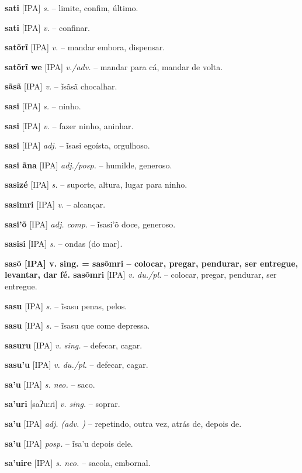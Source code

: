 {\textbf{sati} [IPA] \textit{s.} -- limite, confim, último.

\textbf{sati} [IPA] \textit{v.} -- confinar.

\textbf{satõrĩ} [IPA] \textit{v.} -- mandar embora, dispensar.

\textbf{satõrĩ we} [IPA] \textit{v./adv.} -- mandar para cá, mandar de volta.

\textbf{sãsã} [IPA] \textit{v.} -- ĩsãsã chocalhar.

\textbf{sasi} [IPA] \textit{s.} -- ninho.

\textbf{sasi} [IPA] \textit{v.} -- fazer ninho, aninhar.

\textbf{sasi} [IPA] \textit{adj.} -- ĩsasi egoísta, orgulhoso.

\textbf{sasi ãna} [IPA] \textit{adj./posp.} -- humilde, generoso.

\textbf{sasizé} [IPA] \textit{s.} -- suporte, altura, lugar para ninho.

\textbf{sasimri} [IPA] \textit{v.} -- alcançar.

\textbf{sasi'õ} [IPA] \textit{adj. comp.} -- ĩsasi'õ doce, generoso.

\textbf{sasisi} [IPA] \textit{s.} -- ondas (do mar).

\textbf{sasõ [IPA] v. sing. = sasõmri -- colocar, pregar, pendurar, ser entregue, levantar, dar fé. sasõmri} [IPA] \textit{v. du./pl.} -- colocar, pregar, pendurar, ser entregue.

\textbf{sasu} [IPA] \textit{s.} -- ĩsasu penas, pelos.

\textbf{sasu} [IPA] \textit{s.} -- ĩsasu que come depressa.

\textbf{sasuru} [IPA] \textit{v. sing.} -- defecar, cagar. \href{https://xavante.pythonanywhere.com/static/dicionario/play.html?file=defecate03.wav}{\faHeadphones}

\textbf{sasu'u} [IPA] \textit{v. du./pl.} -- defecar, cagar.

\textbf{sa'u} [IPA] \textit{s. neo.} -- saco.

\textbf{sa'uri} [saʔu:ɾi] \textit{v. sing.} -- soprar. \href{https://xavante.pythonanywhere.com/static/dicionario/play.html?file=blow.wav}{\faHeadphones}

\textbf{sa'u} [IPA] \textit{adj. (adv. )} -- repetindo, outra vez, atrás de, depois de.

\textbf{sa'u} [IPA] \textit{posp.} -- ĩsa'u depois dele.

\textbf{sa'uire} [IPA] \textit{s. neo.} -- sacola, embornal.

}
